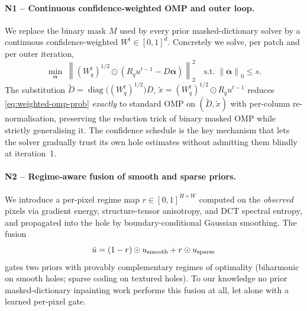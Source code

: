 \documentclass[11pt,a4paper]{article}
\theoremstyle{definition}
\theoremstyle{remark}
\newcommand{\norm}[1]{\left\lVert #1 \right\rVert}
\newcommand{\diag}{\operatorname{diag}}
\newcommand{\alphavec}{\bm{\alpha}}
\begin{document}
\paragraph{N1 -- Continuous confidence-weighted OMP and outer loop.}
We replace the binary mask $M$ used by every prior masked-dictionary
solver by a continuous confidence-weighted $W^t\in[0,1]^d$. Concretely
we solve, per patch and per outer iteration,
\begin{equation}
\min_{\alphavec}\;\norm{(W^t_q)^{1/2}\odot(R_q u^{t-1}-D\alphavec)}_2^2
\quad\text{s.t.}\;\norm{\alphavec}_0\le s.
\label{eq:weighted-omp-prob}
\end{equation}
The substitution $\widetilde D = \diag\bigl((W^t_q)^{1/2}\bigr)D$,
$\widetilde x = (W^t_q)^{1/2}\odot R_q u^{t-1}$ reduces
\eqref{eq:weighted-omp-prob} \emph{exactly} to standard OMP on
$(\widetilde D,\widetilde x)$ with per-column re-normalisation,
preserving the reduction trick of binary masked OMP while
strictly generalising it. The confidence schedule is the key
mechanism that lets the solver gradually trust its own hole estimates
without admitting them blindly at iteration~1.

\paragraph{N2 -- Regime-aware fusion of smooth and sparse priors.}
We introduce a per-pixel regime map $r\in[0,1]^{H\times W}$ computed
on the \emph{observed} pixels via gradient energy, structure-tensor
anisotropy, and DCT spectral entropy, and propagated into the hole by
boundary-conditional Gaussian smoothing. The fusion
\[
\bar u = (1-r)\odot u_{\rm smooth} + r\odot u_{\rm sparse}
\]
gates two priors with provably complementary regimes of optimality
(biharmonic on smooth holes; sparse coding on textured holes). To our
knowledge no prior masked-dictionary inpainting work performs this
fusion at all, let alone with a learned per-pixel gate.
\end{document}
